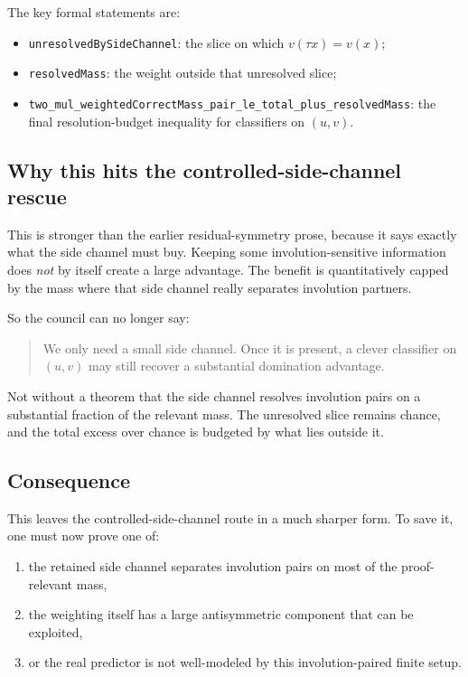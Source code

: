 \documentclass[11pt]{article}
\theoremstyle{remark}
\begin{document}
\noindent
The key formal statements are:
\begin{itemize}[leftmargin=1.5em]
  \item \texttt{unresolvedBySideChannel}: the slice on which \(v(\tau x)=v(x)\);
  \item \texttt{resolvedMass}: the weight outside that unresolved slice;
  \item \texttt{two\_mul\_weightedCorrectMass\_pair\_le\_total\_plus\_resolvedMass}: the final
  resolution-budget inequality for classifiers on \((u,v)\).
\end{itemize}

\subsection{Why this hits the controlled-side-channel rescue}

This is stronger than the earlier residual-symmetry prose, because it says exactly what the side
channel must buy.  Keeping some involution-sensitive information does \emph{not} by itself create a
large advantage.  The benefit is quantitatively capped by the mass where that side channel really
separates involution partners.

So the council can no longer say:
\begin{quote}
We only need a small side channel.  Once it is present, a clever classifier on \((u,v)\) may still
recover a substantial domination advantage.
\end{quote}

Not without a theorem that the side channel resolves involution pairs on a substantial fraction of
the relevant mass.  The unresolved slice remains chance, and the total excess over chance is budgeted
by what lies outside it.

\subsection{Consequence}

This leaves the controlled-side-channel route in a much sharper form.  To save it, one must now
prove one of:
\begin{enumerate}[leftmargin=1.5em]
  \item the retained side channel separates involution pairs on most of the proof-relevant mass,
  \item the weighting itself has a large antisymmetric component that can be exploited,
  \item or the real predictor is not well-modeled by this involution-paired finite setup.
\end{enumerate}
\end{document}
